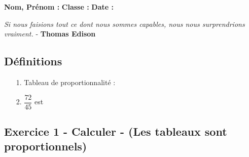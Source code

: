 



\textbf{Nom, Prénom :} \hspace{8cm} \textbf{Classe :} \hspace{3cm} \textbf{Date :}\\
\vspace{-0.8cm}
\begin{center}
  \textit{Si nous faisions tout ce dont nous sommes capables, nous nous surprendrions vraiment.}  - \textbf{Thomas Edison}
\end{center}
\vspace{-0.8cm}

\subsection*{Définitions}
  \begin{enumerate}
    \item[1.] Tableau de proportionnalité : \dotfill \\
    \Pointilles[2]
    \item[2.] $\dfrac{72}{45}$ est \dotfill \\
    \Pointilles[1]
  \end{enumerate}

\subsection*{Exercice 1 - Calculer - (Les tableaux sont proportionnels)}


